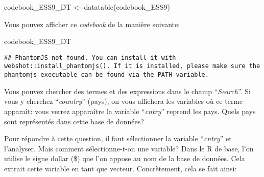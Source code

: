 \documentclass[
]{book}
\newenvironment{Shaded}{\begin{snugshade}}{\end{snugshade}}
\newcommand{\FunctionTok}[1]{\textcolor[rgb]{0.00,0.00,0.00}{#1}}
\newcommand{\NormalTok}[1]{#1}
\newcommand{\OtherTok}[1]{\textcolor[rgb]{0.56,0.35,0.01}{#1}}
\newcommand{\SpecialCharTok}[1]{\textcolor[rgb]{0.00,0.00,0.00}{#1}}
\begin{document}
\begin{Shaded}
\begin{Highlighting}[]
\NormalTok{codebook\_ESS9\_DT }\OtherTok{\textless{}{-}} \FunctionTok{datatable}\NormalTok{(codebook\_ESS9)}
\end{Highlighting}
\end{Shaded}

Vous pouvez afficher ce \emph{codebook} de la manière suivante:

\begin{Shaded}
\begin{Highlighting}[]
\NormalTok{codebook\_ESS9\_DT}
\end{Highlighting}
\end{Shaded}

\begin{verbatim}
## PhantomJS not found. You can install it with webshot::install_phantomjs(). If it is installed, please make sure the phantomjs executable can be found via the PATH variable.
\end{verbatim}

Vous pouvez chercher des termes et des expressions dans le champ ``\emph{Search}''. Si vous y cherchez ``\emph{country}'' (pays), on vous affichera les variables où ce terme apparaît: vous verrez apparaître la variable ``\emph{cntry}'' reprend les pays. Quels pays sont représentés dans cette base de données?

Pour répondre à cette question, il faut sélectionner la variable ``\emph{cntry}'' et l'analyser. Mais comment sélectionne-t-on une variable? Dans le R de base, l'on utilise le signe dollar (\$) que l'on appose au nom de la base de données. Cela extrait cette variable en tant que vecteur. Concrètement, cela se fait ainsi:

\begin{Shaded}
\end{Shaded}
\end{document}
